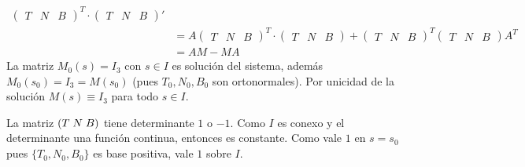 \documentclass{article}
\begin{document}
\begin{dem}
\begin{align*}
        \begin{pmatrix}
            T & N & B
        \end{pmatrix}^{T}\cdot
        \begin{pmatrix}
            T & N & B
        \end{pmatrix}' \\
        &= A
        \begin{pmatrix}
            T & N & B
        \end{pmatrix}^{T}\cdot
        \begin{pmatrix}
            T & N & B
        \end{pmatrix}+
        \begin{pmatrix}
            T & N & B
        \end{pmatrix}^{T}
        \begin{pmatrix}
            T & N & B
        \end{pmatrix}A^{T} \\
        &= AM-MA
    \end{align*}
    La matriz $M_{0}(s)=I_{3}$ con $s\in I$ es solución del sistema, además
    $M_{0}(s_{0})=I_{3}=M(s_{0})$ (pues $T_{0},N_{0},B_{0}$ son ortonormales). Por unicidad de la 
    solución $M(s)\equiv I_{3}$ para todo $s\in I$.
    \vspace{4mm}

    \noindent La matriz $(T\hspace{1mm}N\hspace{1mm}B)$ tiene determinante $1$ o $-1$. Como $I$ es
    conexo y el determinante una función continua, entonces es constante. Como vale $1$ en 
    $s=s_{0}$ pues $\{T_{0},N_{0},B_{0}\}$ es base positiva, vale $1$ sobre $I$.
    \vspace{4mm}


\end{dem}
\end{document}

